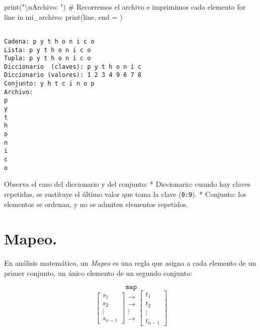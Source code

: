\documentclass[
  letterpaper,
  DIV=11,
  numbers=noendperiod]{scrreprt}
\newenvironment{Shaded}{\begin{snugshade}}{\end{snugshade}}
\newcommand{\BuiltInTok}[1]{\textcolor[rgb]{0.00,0.23,0.31}{#1}}
\newcommand{\CharTok}[1]{\textcolor[rgb]{0.13,0.47,0.30}{#1}}
\newcommand{\CommentTok}[1]{\textcolor[rgb]{0.37,0.37,0.37}{#1}}
\newcommand{\ControlFlowTok}[1]{\textcolor[rgb]{0.00,0.23,0.31}{#1}}
\newcommand{\KeywordTok}[1]{\textcolor[rgb]{0.00,0.23,0.31}{#1}}
\newcommand{\NormalTok}[1]{\textcolor[rgb]{0.00,0.23,0.31}{#1}}
\newcommand{\OperatorTok}[1]{\textcolor[rgb]{0.37,0.37,0.37}{#1}}
\newcommand{\StringTok}[1]{\textcolor[rgb]{0.13,0.47,0.30}{#1}}
\begin{document}
\begin{Shaded}
\begin{Highlighting}[]
\BuiltInTok{print}\NormalTok{(}\StringTok{"}\CharTok{\textbackslash{}n}\StringTok{Archivo: "}\NormalTok{) }
\CommentTok{\# Recorremos el archivo e imprimimos cada elemento }
\ControlFlowTok{for}\NormalTok{ line }\KeywordTok{in}\NormalTok{ mi\_archivo:}
    \BuiltInTok{print}\NormalTok{(line, end }\OperatorTok{=} \StringTok{\textquotesingle{}\textquotesingle{}}\NormalTok{)}
\end{Highlighting}
\end{Shaded}

\begin{verbatim}

Cadena: p y t h o n i c o 
Lista: p y t h o n i c o 
Tupla: p y t h o n i c o 
Diccionario  (claves): p y t h o n i c 
Diccionario (valores): 1 2 3 4 9 6 7 8 
Conjunto: y h t c i n o p 
Archivo: 
p
y
t
h
o
n
i
c
o
\end{verbatim}

Observa el caso del diccionario y del conjunto: * Diccionario: cuando
hay claves repetidas, se sustituye el último valor que toma la clave
(\texttt{\textquotesingle{}0\textquotesingle{}:9}). * Conjunto: los
elementos se ordenan, y no se admiten elementos repetidos.


\chapter{Mapeo.}\label{mapeo.}

En análisis matemático, un \emph{Mapeo} es una regla que asigna a cada
elemento de un primer conjunto, un único elemento de un segundo
conjunto:

\[
\texttt{map} 
\] \[
\left[
\begin{matrix}
s_1 \\
s_2 \\
\vdots \\
s_{n-1}
\end{matrix}
\right]
\begin{matrix}
\longrightarrow \\
\longrightarrow \\
\vdots \\
\longrightarrow
\end{matrix}
\left[
\begin{matrix}
t_1 \\
t_2 \\
\vdots \\
t_{n-1}
\end{matrix}
\right]
\]
\end{document}
